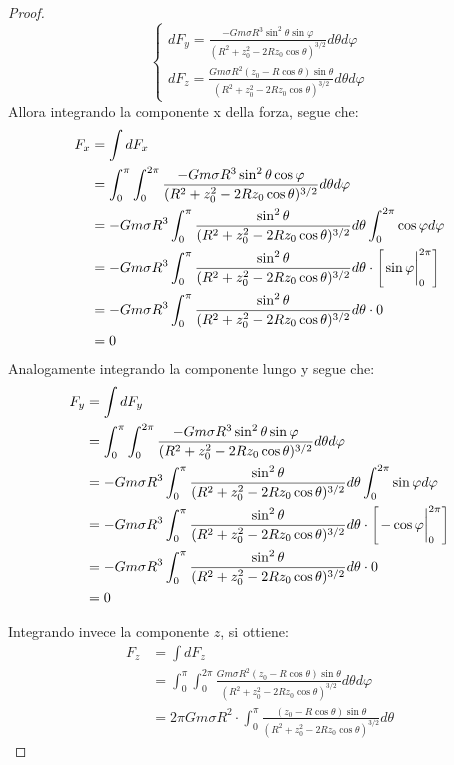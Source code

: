 \documentclass[11pt]{article}
\theoremstyle{plain}
\begin{document}
\begin{proof}
\begin{equation}
\begin{cases}
            \displaystyle dF_y = \frac{-Gm\sigma R^3\sin^2\theta\sin\varphi}{(R^2 + z_0^2 - 2Rz_0\cos\theta)^{3/2}}d\theta d\varphi \\[1.2em]
            \displaystyle dF_z = \frac{Gm\sigma R^2 (z_0 - R\cos\theta)\sin\theta}{(R^2 + z_0^2 - 2Rz_0\cos\theta)^{3/2}}d\theta d\varphi
        \end{cases}
    \end{equation}
    Allora integrando la componente x della forza, segue che:
    \begin{align}
        F_x & = \int dF_x \\
            & = \int_{0}^{\pi}\int_{0}^{2\pi} \frac{-Gm\sigma R^3\sin^2\theta\cos\varphi}{(R^2 + z_0^2 - 2Rz_0\cos\theta)^{3/2}}d\theta d\varphi \\
            & = -Gm\sigma R^3 \int_{0}^{\pi} \frac{\sin^2\theta}{(R^2 + z_0^2 - 2Rz_0\cos\theta)^{3/2}}d\theta \int_{0}^{2\pi} \cos\varphi d\varphi \\
            & = -Gm\sigma R^3 \int_{0}^{\pi} \frac{\sin^2\theta}{(R^2 + z_0^2 - 2Rz_0\cos\theta)^{3/2}}d\theta \cdot \left[\eval{\sin\varphi}_{0}^{2\pi}\right] \\
            & = -Gm\sigma R^3 \int_{0}^{\pi} \frac{\sin^2\theta}{(R^2 + z_0^2 - 2Rz_0\cos\theta)^{3/2}}d\theta \cdot 0 \\
            & = 0
    \end{align}
    Analogamente integrando la componente lungo y segue che:
    \begin{align}
        F_y & = \int dF_y \\
            & = \int_{0}^{\pi}\int_{0}^{2\pi} \frac{-Gm\sigma R^3\sin^2\theta\sin\varphi}{(R^2 + z_0^2 - 2Rz_0\cos\theta)^{3/2}}d\theta d\varphi \\
            & = -Gm\sigma R^3 \int_{0}^{\pi} \frac{\sin^2\theta}{(R^2 + z_0^2 - 2Rz_0\cos\theta)^{3/2}}d\theta \int_{0}^{2\pi} \sin\varphi d\varphi \\
            & = -Gm\sigma R^3 \int_{0}^{\pi} \frac{\sin^2\theta}{(R^2 + z_0^2 - 2Rz_0\cos\theta)^{3/2}}d\theta \cdot \left[\eval{-\cos\varphi}_{0}^{2\pi}\right] \\
            & = -Gm\sigma R^3 \int_{0}^{\pi} \frac{\sin^2\theta}{(R^2 + z_0^2 - 2Rz_0\cos\theta)^{3/2}}d\theta \cdot 0 \\
            & = 0
    \end{align}

    Integrando invece la componente $z$, si ottiene:
    \begin{align}
        F_z & = \int dF_z \\
            & = \int_{0}^{\pi} \int_{0}^{2\pi} \frac{Gm\sigma R^2 (z_0 - R\cos\theta)\sin\theta}{(R^2 + z_0^2 - 2Rz_0\cos\theta)^{3/2}}d\theta d\varphi \\
            & = 2\pi Gm\sigma R^2 \cdot \int_{0}^{\pi} \frac{(z_0 - R\cos\theta)\sin\theta}{(R^2 + z_0^2 - 2Rz_0\cos\theta)^{3/2}}d\theta
    \end{align}


\end{proof}
\end{document}

